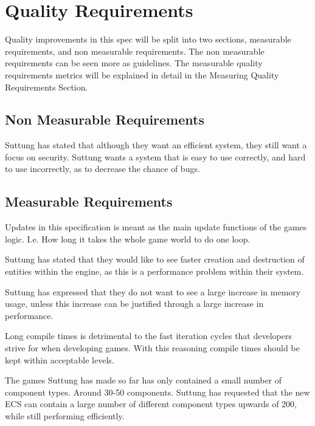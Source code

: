 \section{Quality Requirements}
Quality improvements in this spec will be split into two sections,
measurable requirements, and non measurable requirements.
The non measurable requirements can be seen more as guidelines. 
The measurable quality requirements metrics will be explained in detail in the Measuring Quality Requirements Section.

\subsection{Non Measurable Requirements}
Suttung has stated that although they want an efficient system, they still want a focus on security.
Suttung wants a system that is easy to use correctly, and hard to use incorrectly, as to decrease the chance of bugs.

\subsection{Measurable Requirements}
Updates in this specification is meant as the main update functions of the games logic.
I.e. How long it takes the whole game world to do one loop.

Suttung has stated that they would like to see faster creation and destruction of entities within the engine, 
as this is a performance problem within their system.

Suttung has expressed that they do not want to see a large increase in memory usage, 
unless this increase can be justified through a large increase in performance.

Long compile times is detrimental to the fast iteration cycles that developers strive for when developing games.
With this reasoning compile times should be kept within acceptable levels.

The games Suttung has made so far has only contained a small number of component types. Around 30-50 components.
Suttung has requested that the new ECS can contain a large number of different component types upwards of 200, 
while still performing efficiently. 